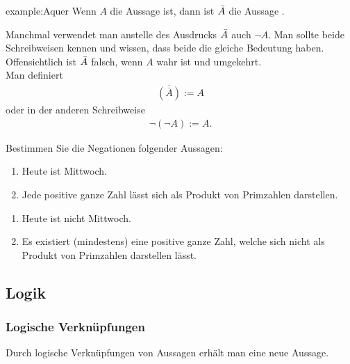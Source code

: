 \begin{example}{example:Aquer}
	Wenn $A$ die Aussage  ist, dann ist $\Bar{A}$ die Aussage .\\
\end{example}
Manchmal verwendet man anstelle des Ausdrucks $\Bar{A}$ auch $\neg A$. Man sollte beide Schreibweisen kennen und wissen, dass beide die gleiche Bedeutung haben.\\
Offensichtlich ist $\Bar{A}$ falsch, wenn $A$ wahr ist und umgekehrt.\\
Man definiert
\begin{align}
	\overline{(\overline{A})} := A
\end{align}
oder in der anderen Schreibweise
\begin{align*}
	\neg (\neg A) := A.
\end{align*}


\begin{myexercise}%
	\noindent
	Bestimmen Sie die Negationen folgender Aussagen:
	\begin{enumerate}[label=(\alph*)]
		\item Heute ist Mittwoch.
		\item Jede positive ganze Zahl lässt sich als Produkt von Primzahlen darstellen.
	\end{enumerate}
\end{myexercise}
\begin{myanswer}
	\noindent
	\begin{enumerate}[label=(\alph*)]
		\item Heute ist nicht Mittwoch.
		\item Es existiert (mindestens) eine positive ganze Zahl, welche sich nicht als Produkt von Primzahlen darstellen lässt.
	\end{enumerate}
\end{myanswer}

\subsection{Logik}
\subsubsection{Logische Verknüpfungen}
Durch logische Verknüpfungen von Aussagen erhält man eine neue Aussage.\\

